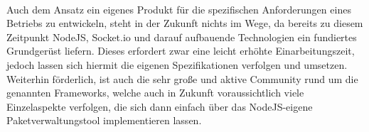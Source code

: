 \\ Auch dem Ansatz ein eigenes Produkt für die spezifischen Anforderungen eines Betriebs zu entwickeln, steht in der Zukunft nichts im Wege, da bereits zu diesem Zeitpunkt \gls{NodeJS}, Socket.io und darauf aufbauende Technologien ein fundiertes Grundgerüst liefern. 
Dieses erfordert zwar eine leicht erhöhte Einarbeitungszeit, jedoch lassen sich hiermit die eigenen Spezifikationen verfolgen und umsetzen. Weiterhin förderlich, ist auch die sehr große und aktive Community rund um die genannten \Gls{Framework}s, welche auch in Zukunft voraussichtlich viele Einzelaspekte verfolgen, die sich dann einfach über das \gls{NodeJS}-eigene Paketverwaltungstool implementieren lassen.








